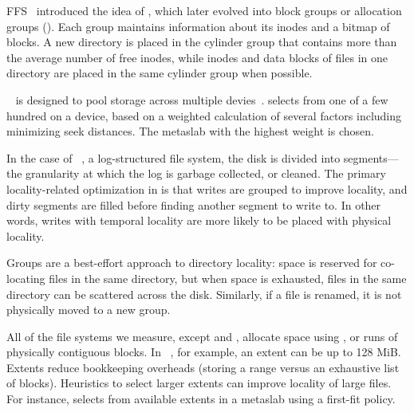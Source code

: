 FFS~\cite{McKusickJoLe84} introduced the idea of ,
which later evolved into block groups or allocation groups (\xfs).
Each
group maintains information about its inodes and a bitmap of blocks. A
new directory is placed in the cylinder group that contains more than the
average number of free inodes, while inodes and data blocks of files in one
directory are placed in the same cylinder group when possible.

\zfs~\cite{BonwickMo08} is designed to pool
storage across multiple devies~\cite{BonwickMo08}.
\zfs selects from one of a few hundred  on a 
device, based on a weighted calculation of several factors
including minimizing seek distances.
The metaslab with the highest weight is chosen.

In the case of \ftwofs~\cite{lee15f2fs}, a log-structured file system, 
the disk is divided into segments---the granularity at which the log is garbage collected, or cleaned.
The primary locality-related optimization in \ftwofs is that writes
are grouped to improve locality, and dirty segments are filled before
finding another segment to write to. In other words, writes with temporal
locality are more likely to be placed with physical locality.

Groups are a best-effort approach to directory locality:
space is reserved for co-locating files in the same directory,
but when space is exhausted, files in the same directory can be scattered
across the disk.  Similarly, if a file is renamed, it is not physically moved
to a new group.

 All of the file systems we measure, except \ftwofs and
\betrfs,
allocate space using , or runs of physically contiguous blocks.
In \ext~\cite{CardTsTw94,Tweedie00, MathurCaBh07}, for example, an extent can be up to 128 MiB.  Extents reduce
bookkeeping overheads (storing a range versus an exhaustive list of blocks).
Heuristics to select larger extents can improve locality of large files.  For
instance, \zfs selects from available extents in a metaslab using a first-fit
policy.

